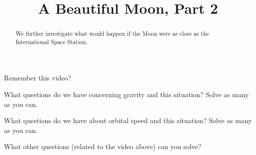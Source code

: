 \documentclass[handout,nonumbers,space]{ximera}
\title{A Beautiful Moon, Part 2}
\begin{document}
\begin{abstract}
We further investigate what would happen if the Moon were as close as the
International Space Station.
\end{abstract}
\maketitle
Remember this video?


\begin{problem}
What questions do we have concerning gravity and this situation? Solve
as many as you can.
\begin{freeResponse}
\end{freeResponse}
\end{problem}

\begin{problem}
What questions do we have about orbital speed and this situation?
Solve as many as you can.
\begin{freeResponse}
\end{freeResponse}
\end{problem}

\break

\begin{problem}
What other questions (related to the video above) can you solve?
\begin{freeResponse}
\end{freeResponse}
\end{problem}


\end{document}
